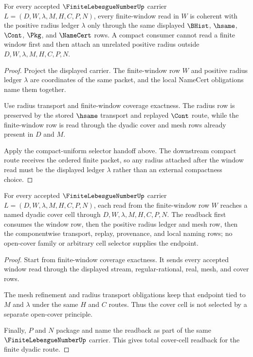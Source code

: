\begin{theorem}
\label{thm:finite-lebesgue-number-window-radius-ledger-coherence}
For every accepted $\FiniteLebesgueNumberUp$ carrier $L=(D,W,\lambda,M,H,C,P,N)$, every finite-window read in $W$ is coherent with the positive radius ledger $\lambda$ only through the same displayed $\BHist$, $\hsame$, $\Cont$, $\Pkg$, and $\NameCert$ rows. A compact consumer cannot read a finite window first and then attach an unrelated positive radius outside $D,W,\lambda,M,H,C,P,N$.
\end{theorem}
\begin{proof}
Project the displayed carrier. The finite-window row $W$ and positive radius ledger $\lambda$ are coordinates of the same packet, and the local NameCert obligations name them together.

Use radius transport and finite-window coverage exactness. The radius row is preserved by the stored $\hsame$ transport and replayed $\Cont$ route, while the finite-window row is read through the dyadic cover and mesh rows already present in $D$ and $M$.

Apply the compact-uniform selector handoff above. The downstream compact route receives the ordered finite packet, so any radius attached after the window read must be the displayed ledger $\lambda$ rather than an external compactness choice.
\end{proof}

\begin{theorem}
\label{thm:finite-lebesgue-number-cover-cell-readback-totality}
For every accepted $\FiniteLebesgueNumberUp$ carrier $L=(D,W,\lambda,M,H,C,P,N)$, each read from the finite-window row $W$ reaches a named dyadic cover cell through $D,W,\lambda,M,H,C,P,N$. The readback first consumes the window row, then the positive radius ledger and mesh row, then the componentwise transport, replay, provenance, and local naming rows; no open-cover family or arbitrary cell selector supplies the endpoint.
\end{theorem}
\begin{proof}
Start from finite-window coverage exactness. It sends every accepted window read through the displayed stream, regular-rational, real, mesh, and cover rows.

The mesh refinement and radius transport obligations keep that endpoint tied to $M$ and $\lambda$ under the same $H$ and $C$ routes. Thus the cover cell is not selected by a separate open-cover principle.

Finally, $P$ and $N$ package and name the readback as part of the same $\FiniteLebesgueNumberUp$ carrier. This gives total cover-cell readback for the finite dyadic route.
\end{proof}

